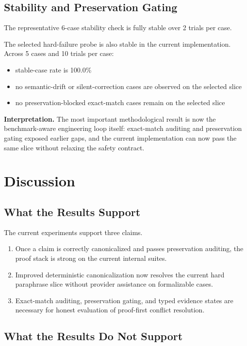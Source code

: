 \documentclass[11pt]{article}
\begin{document}
\subsection{Stability and Preservation Gating}

The representative 6-case stability check is fully stable over 2 trials per
case.

The selected hard-failure probe is also stable in the current implementation.
Across 5 cases and 10 trials per case:

\begin{itemize}
  \item stable-case rate is 100.0\%
  \item no semantic-drift or silent-correction cases are observed on the
  selected slice
  \item no preservation-blocked exact-match cases remain on the selected slice
\end{itemize}

\textbf{Interpretation.} The most important methodological result is now the
benchmark-aware engineering loop itself: exact-match auditing and preservation
gating exposed earlier gaps, and the current implementation can now pass the
same slice without relaxing the safety contract.

\section{Discussion}

\subsection{What the Results Support}

The current experiments support three claims.

\begin{enumerate}
  \item Once a claim is correctly canonicalized and passes preservation
  auditing, the proof stack is strong on the current internal suites.
  \item Improved deterministic canonicalization now resolves the current hard
  paraphrase slice without provider assistance on formalizable cases.
  \item Exact-match auditing, preservation gating, and typed evidence states
  are necessary for honest evaluation of proof-first conflict resolution.
\end{enumerate}

\subsection{What the Results Do Not Support}
\end{document}
